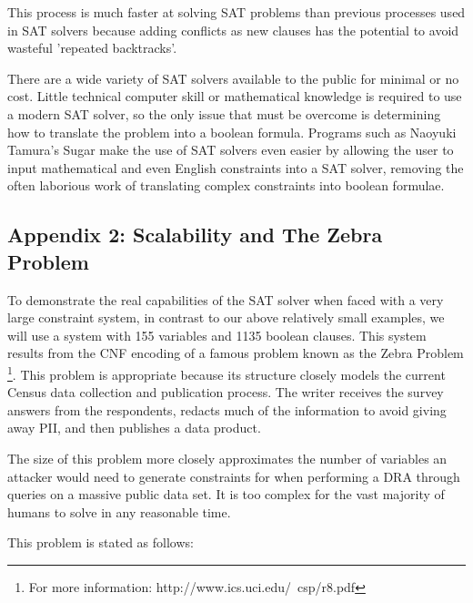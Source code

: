 \documentclass[jou,apacite]{apa6}
\begin{document}
This process is much faster at solving SAT problems than previous processes used in SAT solvers because adding conflicts as new clauses has the potential to avoid wasteful 'repeated backtracks'.

There are a wide variety of SAT solvers available to the public for minimal or no cost. Little technical computer skill or mathematical knowledge is required to use a modern SAT solver, so the only issue that must be overcome is determining how to translate the problem into a boolean formula. Programs such as Naoyuki Tamura's Sugar make the use of SAT solvers even easier by allowing the user to input mathematical and even English constraints into a SAT solver, removing the often laborious work of translating complex constraints into boolean formulae.

\subsection{Appendix 2: Scalability and The Zebra Problem}

To demonstrate the real capabilities of the SAT solver when faced with a very large constraint system, in contrast to our above relatively small examples, we will use a system with 155 variables and 1135 boolean clauses. This system results from the CNF encoding of a famous problem known as the Zebra Problem \footnote{For more information: http://www.ics.uci.edu/~csp/r8.pdf}.
This problem is appropriate because its structure closely models the current Census data collection and publication process. The writer receives the survey answers from the respondents, redacts much of the information to avoid giving away PII, and then publishes a data product.

The size of this problem more closely approximates the number
of variables an attacker would need to generate constraints for when performing a DRA through queries on a massive public data set. It is too complex for the vast majority of humans to solve in any reasonable time.

This problem is stated as follows:
\end{document}
